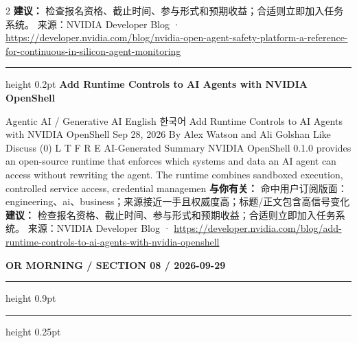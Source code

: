 \documentclass[10.5pt]{ctexart}
\begin{document}
\begin{multicols}{2}
\textbf{建议：} 检查报名资格、截止时间、参与形式和预期收益；合适则立即加入任务系统。
{\footnotesize\color{ormuted} 来源：NVIDIA Developer Blog · \url{https://developer.nvidia.com/blog/nvidia-open-agent-safety-platform-a-reference-for-continuous-in-silicon-agent-monitoring}}
\vspace{2mm}
\hrule height 0.2pt
\vspace{2mm}
{\large\bfseries Add Runtime Controls to AI Agents with NVIDIA OpenShell}\par
Agentic AI / Generative AI English 한국어 Add Runtime Controls to AI Agents with NVIDIA OpenShell Sep 28, 2026 By Alex Watson and Ali Golshan Like Discuss (0) L T F R E AI-Generated Summary NVIDIA OpenShell 0.1.0 provides an open-source runtime that enforces which systems and data an AI agent can access without rewriting the agent. The runtime combines sandboxed execution, controlled service access, credential managemen
\textbf{与你有关：} 命中用户订阅版面：engineering、ai、business；来源接近一手且权威度高；标题/正文包含高信号变化
\textbf{建议：} 检查报名资格、截止时间、参与形式和预期收益；合适则立即加入任务系统。
{\footnotesize\color{ormuted} 来源：NVIDIA Developer Blog · \url{https://developer.nvidia.com/blog/add-runtime-controls-to-ai-agents-with-nvidia-openshell}}
\end{multicols}
\newpage
{\small\bfseries OR MORNING / SECTION 08 / 2026-09-29}
\vspace{2mm}
\hrule height 0.9pt
\vspace{1.5mm}
\hrule height 0.25pt
\vspace{4mm}
\end{document}
